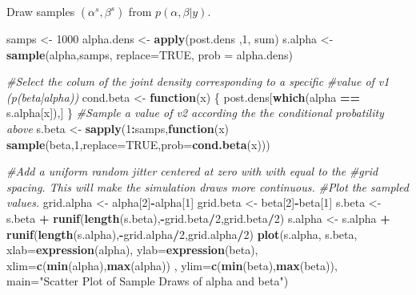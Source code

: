 \documentclass[]{article}
\newenvironment{Shaded}{\begin{snugshade}}{\end{snugshade}}
\newcommand{\KeywordTok}[1]{\textcolor[rgb]{0.13,0.29,0.53}{\textbf{#1}}}
\newcommand{\DataTypeTok}[1]{\textcolor[rgb]{0.13,0.29,0.53}{#1}}
\newcommand{\DecValTok}[1]{\textcolor[rgb]{0.00,0.00,0.81}{#1}}
\newcommand{\StringTok}[1]{\textcolor[rgb]{0.31,0.60,0.02}{#1}}
\newcommand{\CommentTok}[1]{\textcolor[rgb]{0.56,0.35,0.01}{\textit{#1}}}
\newcommand{\OtherTok}[1]{\textcolor[rgb]{0.56,0.35,0.01}{#1}}
\newcommand{\ControlFlowTok}[1]{\textcolor[rgb]{0.13,0.29,0.53}{\textbf{#1}}}
\newcommand{\OperatorTok}[1]{\textcolor[rgb]{0.81,0.36,0.00}{\textbf{#1}}}
\newcommand{\NormalTok}[1]{#1}
\begin{document}
Draw samples \((\alpha^{s}, \beta^{s})\) from \(p(\alpha,\beta|y)\).

\begin{Shaded}
\begin{Highlighting}[]
\NormalTok{samps           <-}\StringTok{  }\DecValTok{1000}
\NormalTok{alpha.dens      <-}\StringTok{  }\KeywordTok{apply}\NormalTok{(post.dens ,}\DecValTok{1}\NormalTok{, sum)}
\NormalTok{s.alpha         <-}\StringTok{  }\KeywordTok{sample}\NormalTok{(alpha,samps, }\DataTypeTok{replace=}\OtherTok{TRUE}\NormalTok{, }\DataTypeTok{prob =}\NormalTok{ alpha.dens)}

\CommentTok{#Select the colum of the joint density corresponding to a specific }
\CommentTok{#value of v1 (p(beta|alpha))}
\NormalTok{cond.beta       <-}\StringTok{  }\ControlFlowTok{function}\NormalTok{(x) \{}
\NormalTok{  post.dens[}\KeywordTok{which}\NormalTok{(alpha }\OperatorTok{==}\StringTok{ }\NormalTok{s.alpha[x]),]}
\NormalTok{\}}
\CommentTok{#Sample a value of v2 according the the conditional probatility above}
\NormalTok{s.beta          <-}\StringTok{  }\KeywordTok{sapply}\NormalTok{(}\DecValTok{1}\OperatorTok{:}\NormalTok{samps,}\ControlFlowTok{function}\NormalTok{(x) }
  \KeywordTok{sample}\NormalTok{(beta,}\DecValTok{1}\NormalTok{,}\DataTypeTok{replace=}\OtherTok{TRUE}\NormalTok{,}\DataTypeTok{prob=}\KeywordTok{cond.beta}\NormalTok{(x)))}

\CommentTok{#Add a uniform random jitter centered at zero with with equal to the }
\CommentTok{#grid spacing. This will make the simulation draws more continuous. }
\CommentTok{#Plot the sampled values.  }
\NormalTok{grid.alpha      <-}\StringTok{  }\NormalTok{alpha[}\DecValTok{2}\NormalTok{]}\OperatorTok{-}\NormalTok{alpha[}\DecValTok{1}\NormalTok{]}
\NormalTok{grid.beta       <-}\StringTok{  }\NormalTok{beta[}\DecValTok{2}\NormalTok{]}\OperatorTok{-}\NormalTok{beta[}\DecValTok{1}\NormalTok{]}
\NormalTok{s.beta          <-}\StringTok{  }\NormalTok{s.beta }\OperatorTok{+}\StringTok{ }\KeywordTok{runif}\NormalTok{(}\KeywordTok{length}\NormalTok{(s.beta),}\OperatorTok{-}\NormalTok{grid.beta}\OperatorTok{/}\DecValTok{2}\NormalTok{,grid.beta}\OperatorTok{/}\DecValTok{2}\NormalTok{)}
\NormalTok{s.alpha         <-}\StringTok{  }\NormalTok{s.alpha }\OperatorTok{+}\StringTok{ }\KeywordTok{runif}\NormalTok{(}\KeywordTok{length}\NormalTok{(s.alpha),}\OperatorTok{-}\NormalTok{grid.alpha}\OperatorTok{/}\DecValTok{2}\NormalTok{,grid.alpha}\OperatorTok{/}\DecValTok{2}\NormalTok{)}
\KeywordTok{plot}\NormalTok{(s.alpha, s.beta, }
     \DataTypeTok{xlab=}\KeywordTok{expression}\NormalTok{(alpha), }
     \DataTypeTok{ylab=}\KeywordTok{expression}\NormalTok{(beta), }
     \DataTypeTok{xlim=}\KeywordTok{c}\NormalTok{(}\KeywordTok{min}\NormalTok{(alpha),}\KeywordTok{max}\NormalTok{(alpha)) , }
     \DataTypeTok{ylim=}\KeywordTok{c}\NormalTok{(}\KeywordTok{min}\NormalTok{(beta),}\KeywordTok{max}\NormalTok{(beta)), }
     \DataTypeTok{main=}\StringTok{"Scatter Plot of Sample Draws of alpha and beta"}\NormalTok{)}
\end{Highlighting}
\end{Shaded}
\end{document}
